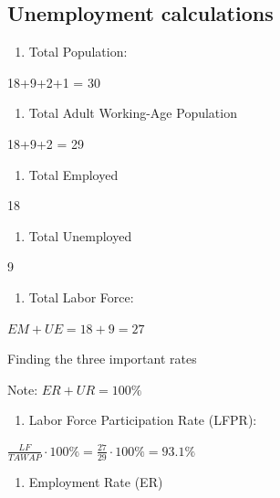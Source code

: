 \documentclass[
  letterpaper,
  DIV=11,
  numbers=noendperiod]{scrartcl}
\providecommand{\tightlist}{%
  \setlength{\itemsep}{0pt}\setlength{\parskip}{0pt}}\usepackage{longtable,booktabs,array}
\begin{document}
\subsection{Unemployment calculations}\label{unemployment-calculations}

\begin{enumerate}
\def\labelenumi{\arabic{enumi}.}
\tightlist
\item
  Total Population:
\end{enumerate}

18+9+2+1 = 30

\begin{enumerate}
\def\labelenumi{\arabic{enumi}.}
\setcounter{enumi}{1}
\tightlist
\item
  Total Adult Working-Age Population
\end{enumerate}

18+9+2 = 29

\begin{enumerate}
\def\labelenumi{\arabic{enumi}.}
\setcounter{enumi}{2}
\tightlist
\item
  Total Employed
\end{enumerate}

18

\begin{enumerate}
\def\labelenumi{\arabic{enumi}.}
\setcounter{enumi}{3}
\tightlist
\item
  Total Unemployed
\end{enumerate}

9

\begin{enumerate}
\def\labelenumi{\arabic{enumi}.}
\setcounter{enumi}{4}
\tightlist
\item
  Total Labor Force:
\end{enumerate}

\(EM+UE = 18+9=27\)

Finding the three important rates

Note: \(ER + UR = 100\%\)

\begin{enumerate}
\def\labelenumi{\arabic{enumi}.}
\tightlist
\item
  Labor Force Participation Rate (LFPR):
\end{enumerate}

\(\frac{LF}{TAWAP} \cdot 100\% = \frac{27}{29} \cdot 100\% = 93.1\%\)

\begin{enumerate}
\def\labelenumi{\arabic{enumi}.}
\setcounter{enumi}{1}
\tightlist
\item
  Employment Rate (ER)
\end{enumerate}
\end{document}
